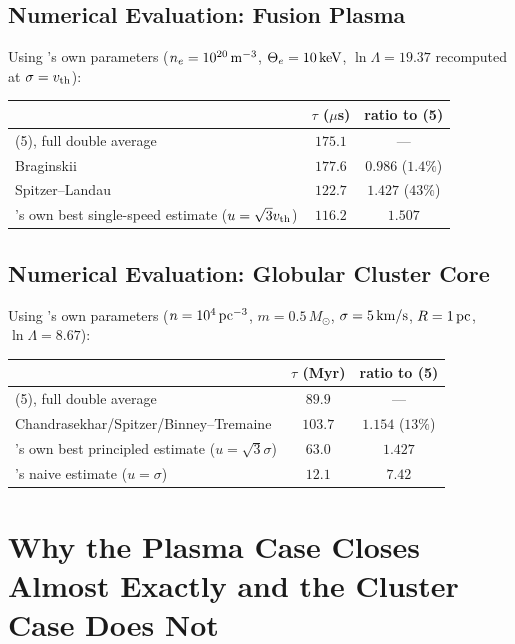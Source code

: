 \documentclass[12pt]{amsart}
\theoremstyle{plain}
\theoremstyle{remark}
\begin{document}
\subsection*{Numerical Evaluation: Fusion Plasma}
Using \cite{Ebert2026Fusion}'s own parameters ($n_e=10^{20}\,{\rm m^{-3}}$, $\Theta_e=10\,{\rm keV}$, $\ln\Lambda=19.37$ recomputed at $\sigma=v_{\rm th}$):
\begin{center}
\begin{tabular}{lcc}
\hline
 & $\tau$ ($\mu$s) & ratio to (5) \\
\hline
(5), full double average & $175.1$ & --- \\
Braginskii \cite{Braginskii1965} & $177.6$ & $0.986$ ($1.4\%$) \\
Spitzer--Landau \cite{SpitzerLandau} & $122.7$ & $1.427$ ($43\%$) \\
\cite{Ebert2026Fusion}'s own best single-speed estimate ($u=\sqrt3v_{\rm th}$) & $116.2$ & $1.507$ \\
\hline
\end{tabular}
\end{center}

\subsection*{Numerical Evaluation: Globular Cluster Core}
Using \cite{Ebert2026Cluster}'s own parameters ($n=10^4\,{\rm pc^{-3}}$, $m=0.5\,M_\odot$, $\sigma=5\,{\rm km/s}$, $R=1\,{\rm pc}$, $\ln\Lambda=8.67$):
\begin{center}
\begin{tabular}{lcc}
\hline
 & $\tau$ (Myr) & ratio to (5) \\
\hline
(5), full double average & $89.9$ & --- \\
Chandrasekhar/Spitzer/Binney--Tremaine \cite{Chandrasekhar1942,Spitzer1987,BinneyTremaine2008} & $103.7$ & $1.154$ ($13\%$) \\
\cite{Ebert2026Cluster}'s own best principled estimate ($u=\sqrt3\sigma$) & $63.0$ & $1.427$ \\
\cite{Ebert2026Cluster}'s naive estimate ($u=\sigma$) & $12.1$ & $7.42$ \\
\hline
\end{tabular}
\end{center}

\section{Why the Plasma Case Closes Almost Exactly and the Cluster Case Does Not}
\end{document}
